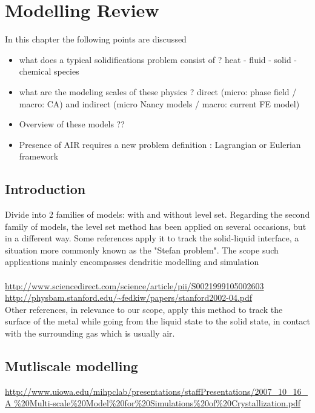 \chapter{Modelling Review}
\minitoc
\newpage

In this chapter the following points are discussed
\begin{itemize}
\item what does a typical solidifications problem consist of ? heat - fluid - solid 
- chemical species
\item what are the modeling scales of these physics ? direct (micro: phase field / macro: CA) 
and indirect (micro Nancy models / macro: current FE model)
\item Overview of these models ??
\item Presence of AIR requires a new problem definition : Lagrangian or Eulerian framework
\end{itemize}

\section{Introduction}
Divide into 2 families of models: with and without level set. Regarding the second family of models,
the level set method has been applied on several occasions, but in a different way. Some references
apply it to track the solid-liquid interface, a situation more commonly known as the "Stefan problem".
The scope such applications mainly encompasses dendritic modelling and simulation \\
 \\
\url{http://www.sciencedirect.com/science/article/pii/S0021999105002603} \\
\url{http://physbam.stanford.edu/~fedkiw/papers/stanford2002-04.pdf} \\
Other references, in relevance to our scope, apply this method to track the surface of the metal
while going from the liquid state to the solid state, in contact with the surrounding gas which is usually air. \\

\section{Mutliscale modelling}
\url{http://www.uiowa.edu/mihpclab/presentations/staffPresentations/2007_10_16_A
} \\

